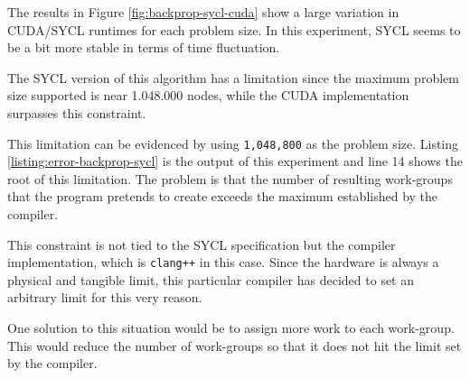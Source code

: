 The results in Figure \ref{fig:backprop-sycl-cuda} show a large variation in CUDA/SYCL runtimes for each problem size.
In this experiment, SYCL seems to be a bit more stable in terms of time fluctuation.

The SYCL version of this algorithm has a limitation since the maximum problem size supported is near 1.048.000 nodes, while the CUDA implementation surpasses this constraint.



This limitation can be evidenced by using \texttt{1,048,800} as the problem size.
Listing \ref{listing:error-backprop-sycl} is the output of this experiment and line 14 shows the root of this limitation.
The problem is that the number of resulting work-groups that the program pretends to create exceeds the maximum established by the compiler.

This constraint is not tied to the SYCL specification but the compiler implementation, which is \texttt{clang++} in this case.
Since the hardware is always a physical and tangible limit, this particular compiler has decided to set an arbitrary limit for this very reason.

One solution to this situation would be to assign more work to each work-group.
This would reduce the number of work-groups so that it does not hit the limit set by the compiler.


